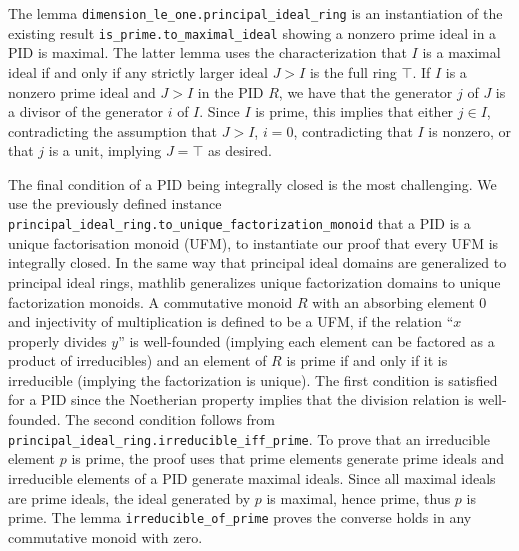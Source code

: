 \documentclass[a4paper,USenglish,cleveref, autoref, thm-restate]{lipics-v2021}
\newcommand{\lean}[1]{\texttt{#1}\xspace} %
\newcommand{\mathlib}{\textsf{mathlib}\xspace}
\begin{document}
The lemma \lean{dimension\_le\_one.principal\_ideal\_ring} is an instantiation of the existing result \lean{is\_prime.to\_maximal\_ideal} showing a nonzero prime ideal in a PID is maximal.
The latter lemma uses the characterization that $I$ is a maximal ideal if and only if any strictly larger ideal $J > I$ is the full ring $\top$.
If $I$ is a nonzero prime ideal and $J > I$ in the PID $R$, we have that the generator $j$ of $J$ is a divisor of the generator $i$ of $I$. Since $I$ is prime, this implies that either $j \in I$, contradicting the assumption that $J > I$, $i = 0$, contradicting that $I$ is nonzero, or that $j$ is a unit, implying $J = \top$ as desired.

The final condition of a PID being integrally closed is the most challenging.
We use the previously defined instance \lean{principal\_ideal\_ring.to\_unique\_factorization\_monoid} that a PID is a unique factorisation monoid (UFM),
to instantiate our proof that every UFM is integrally closed.
In the same way that principal ideal domains are generalized to principal ideal rings, \mathlib generalizes unique factorization domains to unique factorization monoids.
A commutative monoid $R$ with an absorbing element $0$ and injectivity of multiplication is defined to be a UFM,
if the relation ``$x$ properly divides $y$'' is well-founded (implying each element can be factored as a product of irreducibles) and
an element of $R$ is prime if and only if it is irreducible (implying the factorization is unique).
The first condition is satisfied for a PID since the Noetherian property implies that the division relation is well-founded.
The second condition follows from \lean{principal\_ideal\_ring.irreducible\_iff\_prime}.
To prove that an irreducible element $p$ is prime, the proof uses that prime elements generate prime ideals and irreducible elements of a PID generate maximal ideals. Since all maximal ideals are prime ideals, the ideal generated by $p$ is maximal, hence prime, thus $p$ is prime.
The lemma \lean{irreducible\_of\_prime} proves the converse holds in any commutative monoid with zero.
\end{document}
